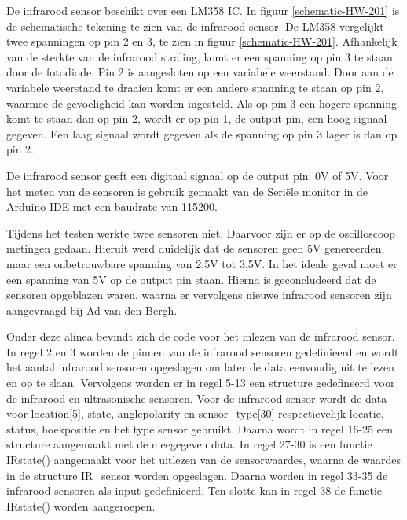 De infrarood sensor beschikt over een LM358 IC\cite{LM358-datasheet}. In figuur \eqref{schematic-HW-201}\cite{HW-201-schema} is de schematische tekening te zien van de infrarood sensor. De LM358 vergelijkt twee spanningen op pin 2 en 3, te zien in figuur \eqref{schematic-HW-201}. Afhankelijk van de sterkte van de infrarood straling, komt er een spanning op pin 3 te staan door de fotodiode. Pin 2 is aangesloten op een variabele weerstand. Door aan de variabele weerstand te draaien komt er een andere spanning te staan op pin 2, waarmee de gevoeligheid kan worden ingesteld. Als op pin 3 een hogere spanning komt te staan dan op pin 2, wordt er op pin 1, de output pin, een hoog signaal gegeven. Een laag signaal wordt gegeven als de spanning op pin 3 lager is dan op pin 2.

De infrarood sensor geeft een digitaal signaal op de output pin: 0V of 5V. Voor het meten van de sensoren is gebruik gemaakt van de Seriële monitor in de Arduino IDE met een baudrate van 115200. 

Tijdens het testen werkte twee sensoren niet. Daarvoor zijn er op de oscilloscoop metingen gedaan. Hieruit werd duidelijk dat de sensoren geen 5V genereerden, maar een onbetrouwbare spanning van 2,5V tot 3,5V. In het ideale geval moet er een spanning van 5V op de output pin staan. Hierna is geconcludeerd dat de sensoren opgeblazen waren, waarna er vervolgens nieuwe infrarood sensoren zijn aangevraagd bij  Ad van den Bergh.

Onder deze alinea bevindt zich de code voor het inlezen van de infrarood sensor. In regel 2 en 3 worden de pinnen van de infrarood sensoren gedefinieerd en wordt het aantal infrarood sensoren opgeslagen om later de data eenvoudig uit te lezen en op te slaan. Vervolgens worden er in regel 5-13 een structure gedefineerd voor de infrarood en ultrasonische sensoren. Voor de infrarood sensor wordt de data voor location[5], state, anglepolarity en sensor\_type[30] respectievelijk locatie, status, hoekpositie en het type sensor gebruikt. Daarna wordt in regel 16-25 een structure aangemaakt met de  meegegeven data. In regel 27-30 is een functie IRstate() aangemaakt voor het uitlezen van de sensorwaardes, waarna de waardes in de structure IR\_sensor worden opgeslagen. Daarna worden in regel 33-35 de infrarood sensoren als input gedefinieerd. Ten slotte kan in regel 38 de functie IRstate() worden aangeroepen.


